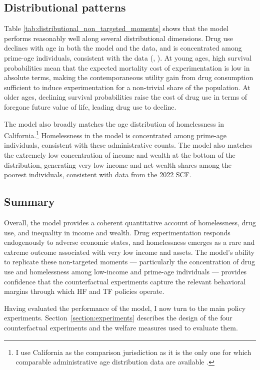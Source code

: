 \documentclass[parskip=full]{article}
\theoremstyle{plain}
\theoremstyle{definition}
\theoremstyle{remark}
\newcommand{\citepshort}[1]{(\citetalias{#1}, \citeyear{#1})}
\begin{document}
\subsection{Distributional patterns}

Table \ref{tab:distributional_non_targeted_moments} shows that the model performs reasonably well along several distributional dimensions. Drug use declines with age in both the model and the data, and is concentrated among prime-age individuals, consistent with the data \citepshort{SAMHSA_2023}. At young ages, high survival probabilities mean that the expected mortality cost of experimentation is low in absolute terms, making the contemporaneous utility gain from drug consumption sufficient to induce experimentation for a non-trivial share of the population. At older ages, declining survival probabilities raise the cost of drug use in terms of foregone future value of life, leading drug use to decline.

The model also broadly matches the age distribution of homelessness in California.\footnote{I use California as the comparison jurisdiction as it is the only one for which comparable administrative age distribution data are available \citep{California_2017}.} Homelessness 
in the model is concentrated among prime-age individuals, consistent with these administrative counts. The model also matches the extremely low concentration of income and wealth at the bottom of the distribution, generating very low income and net wealth shares among the poorest individuals, consistent with data from the 2022 SCF.

\subsection{Summary}

Overall, the model provides a coherent quantitative account of homelessness, drug use, and inequality in income and wealth. Drug experimentation responds endogenously to adverse economic states, and homelessness emerges as a rare and extreme outcome associated with very low income and assets. The model's ability to replicate these non-targeted moments — particularly the concentration of drug use and homelessness among low-income and prime-age individuals — provides confidence that the counterfactual experiments capture the relevant behavioral margins through which HF and TF policies operate.

Having evaluated the performance of the model, I now turn to the main policy experiments. Section~\ref{section:experiments} describes the design of the four counterfactual experiments and the welfare measures used to evaluate them.
\end{document}

